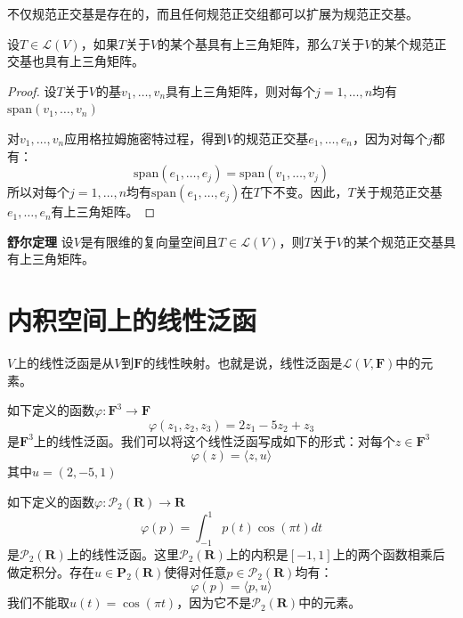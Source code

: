\documentclass[10pt,a4paper,UTF8]{article}
\begin{document}
不仅规范正交基是存在的，而且任何规范正交组都可以扩展为规范正交基。
\begin{theorem}
设\(T\in \mathcal{L}(V)\)，如果\(T\)关于\(V\)的某个基具有上三角矩阵，那么\(T\)关于\(V\)的某个规范正交基也具有上三角矩阵。
\end{theorem}

\begin{proof}
设\(T\)关于\(V\)的基\(v_{1},\ldots ,v_{n}\)具有上三角矩阵，则对每个\(j = 1,\ldots ,n\)均有\(\mathrm{span}(v_{1},\ldots ,v_{n})\)

对\(v_{1},\ldots ,v_{n}\)应用格拉姆施密特过程，得到\(V\)的规范正交基\(e_{1},\ldots ,e_{n}\)，因为对每个\(j\)都有：
\[ \mathrm{span}(e_{1},\ldots ,e_{j} ) = \mathrm{span}(v_{1},\ldots ,v_{j}) \]
所以对每个\(j=1,\ldots ,n\)均有\(\mathrm{span}(e_{1},\ldots ,e_{j})\)在\(T\)下不变。因此，\(T\)关于规范正交基\(e_{1},\ldots ,e_{n}\)有上三角矩阵。
\end{proof}

\begin{theorem}
\textbf{舒尔定理} 设\(V\)是有限维的复向量空间且\(T\in \mathcal{L}(V)\)，则\(T\)关于\(V\)的某个规范正交基具有上三角矩阵。
\end{theorem}

\section{内积空间上的线性泛函}
\label{sec:org749f839}


\begin{definition}
\(V\)上的线性泛函是从\(V\)到\(\mathbf{F}\)的线性映射。也就是说，线性泛函是\(\mathcal{L}(V, \mathbf{F})\)中的元素。
\end{definition}
\begin{instance}
如下定义的函数\(\varphi : \mathbf{F}^{3} \rightarrow \mathbf{F}\)
\[\varphi(z_{1},z_{2},z_{3}) = 2z_{1} - 5z_{2} + z_{3}\]是\(\mathbf{F}^{3}\)上的线性泛函。我们可以将这个线性泛函写成如下的形式：对每个\(z\in \mathbf{F}^{3}\) \[\varphi(z) = \langle z,u \rangle  \]
其中\(u = (2,-5,1)\)
\end{instance}
\begin{instance}
如下定义的函数\(\varphi : \mathcal{P}_{2}(\mathbf{R}) \rightarrow \mathbf{R}\) \[ \varphi(p) = \int_{-1}^{1} p(t)\cos(\pi t)dt \]是\(\mathcal{P}_{2}(\mathbf{R})\)上的线性泛函。这里\(\mathcal{P}_{2}(\mathbf{R})\)上的内积是\([-1,1]\)上的两个函数相乘后做定积分。存在\(u\in \mathbf{P}_{2}(\mathbf{R})\)使得对任意\(p\in \mathcal{P}_{2}(\mathbf{R})\)均有：\[\varphi(p) = \langle p,u \rangle  \] 我们不能取\(u(t) = \cos(\pi t)\)，因为它不是\(\mathcal{P}_{2}(\mathbf{R})\)中的元素。
\end{instance}
\end{document}
